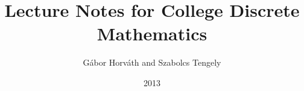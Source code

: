 \documentclass[12pt, a4paper, leqno, twoside%
]{report}%
\theoremstyle{plain}
\theoremstyle{definition}
\theoremstyle{remark}
\begin{document}
\title{\huge{Lecture Notes for College Discrete Mathematics}\\[80pt]}
\author{\Large{G\'{a}bor Horv\'{a}th and Szabolcs Tengely}\\[80pt]}
\date{2013\\[60pt]\vfill}
\maketitle

\tableofcontents



%
%

\renewcommand{\chaptermark}[1]{\markboth{\MakeUppercase{
#1}}%
{\thechapter~
#1}}

\renewcommand{\sectionmark}[1]{\markright{\thesection~
#1}}















%
% 
\end{document}
